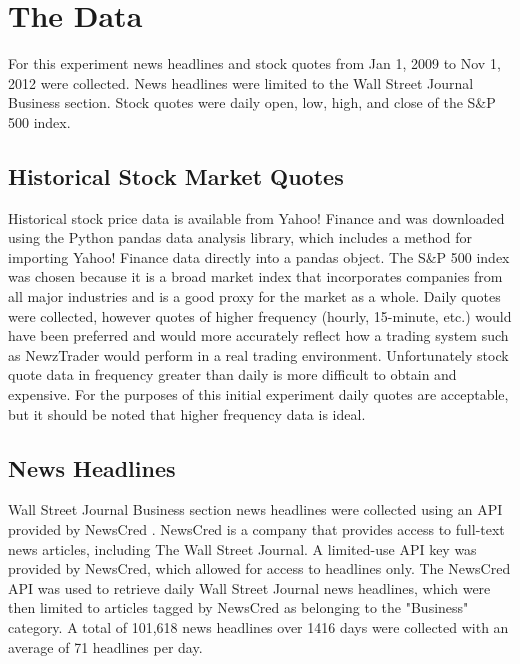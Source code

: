 \documentclass[]{article}
\begin{document}
\section{The Data}
For this experiment news headlines and stock quotes from Jan 1, 2009 to Nov 1, 2012 were collected.  News headlines were limited to the Wall Street Journal Business section.  Stock quotes were daily open, low, high, and close of the S\&P 500 index.
\subsection{Historical Stock Market Quotes}
Historical stock price data is available from Yahoo! Finance and was downloaded using the Python pandas data analysis library, which includes a method for importing Yahoo! Finance data directly into a pandas object.  The S\&P 500 index was chosen because it is a broad market index that incorporates companies from all major industries and is a good proxy for the market as a whole.  Daily quotes were collected, however quotes of higher frequency (hourly, 15-minute, etc.) would have been preferred and would more accurately reflect how a trading system such as NewzTrader would perform in a real trading environment.  Unfortunately stock quote data in frequency greater than daily is more difficult to obtain and expensive.  For the purposes of this initial experiment daily quotes are acceptable, but it should be noted that higher frequency data is ideal.
\subsection{News Headlines}
Wall Street Journal Business section news headlines were collected using an API provided by NewsCred \cite{newscred}.  NewsCred is a company that provides access to full-text news articles, including The Wall Street Journal.  A limited-use API key was provided by NewsCred, which allowed for access to headlines only.  The NewsCred API was used to retrieve daily Wall Street Journal news headlines, which were then limited to articles tagged by NewsCred as belonging to the "Business" category.  A total of 101,618 news headlines over 1416 days were collected with an average of 71 headlines per day.  
\end{document}
